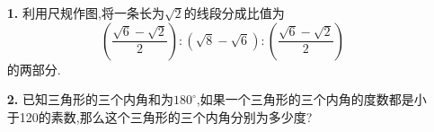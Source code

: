\documentclass[UTF8]{ctexart}
\begin{document}
\begin{itemize}
\item[\textbf{1.}]利用尺规作图,将一条长为$\sqrt{2}$的线段分成比值为
\[\left(\frac{\sqrt{6}-\sqrt{2}}{2}\right):(\sqrt{8}-\sqrt{6}):\left(\frac{\sqrt{6}-\sqrt{2}}{2}\right)\]
的两部分.
\item[\textbf{2.}]已知三角形的三个内角和为$180^{\circ}$,如果一个三角形的三个内角的度数都是小于120的素数,那么这个三角形的三个内角分别为多少度?

\end{itemize}
\end{document}
